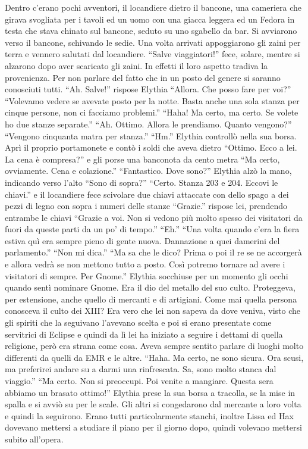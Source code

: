     Dentro c'erano pochi avventori, il locandiere dietro il bancone, una
    cameriera che girava svogliata per i tavoli ed un uomo con una giacca
    leggera ed un Fedora in testa che stava chinato sul bancone, seduto su
    uno sgabello da bar. Si avviarono verso il bancone, schivando le sedie.
    Una volta arrivati appoggiarono gli zaini per terra e vennero salutati
    dal locandiere. ``Salve viaggiatori!'' fece, solare, mentre si alzarono
    dopo aver scaricato gli zaini. In effetti il loro aspetto tradiva la
    provenienza. Per non parlare del fatto che in un posto del genere si
    saranno conosciuti tutti. ``Ah. Salve!'' rispose Elythia ``Allora. Che
    posso fare per voi?'' ``Volevamo vedere se avevate posto per la notte.
    Basta anche una sola stanza per cinque persone, non ci facciamo
    problemi.'' ``Haha! Ma certo, ma certo. Se volete ho due stanze
    separate.'' ``Ah. Ottimo. Allora le prendiamo. Quanto vengono?''
    ``Vengono cinquanta matra per stanza.'' ``Hm.'' Elythia controllò nella
    sua borsa. Aprì il proprio portamonete e contò i soldi che aveva
    dietro ``Ottimo. Ecco a lei. La cena è compresa?'' e gli porse una
    banconota da cento metra ``Ma certo,
    ovviamente. Cena e colazione.'' ``Fantastico. Dove sono?''  Elythia
    alzò la mano, indicando verso l'alto ``Sono di sopra?'' ``Certo. Stanza
    203 e 204. Eccovi le chiavi.'' e il locandiere fece scivolare due
    chiavi attaccate con dello spago a dei pezzi di legno con sopra i
    numeri delle stanze ``Grazie.'' rispose lei, prendendo entrambe le
    chiavi ``Grazie a voi. Non si vedono più molto spesso dei visitatori da
    fuori da queste parti da un po' di tempo.'' ``Eh.'' ``Una volta quando
    c'era la fiera estiva quì era sempre pieno di gente nuova. Dannazione a
    quei damerini del parlamento.'' ``Non mi dica.'' ``Ma sa che le dico?
    Prima o poi il re se ne accorgerà e allora vedrà se non mettono tutto a
    posto. Così potremo tornare ad avere i visitatori di sempre. Per
    Gnome.'' Elythia socchiuse per un momento gli occhi quando sentì
    nominare Gnome. Era il dio del metallo del suo culto. Proteggeva, per
    estensione, anche quello di mercanti e di artigiani. Come mai quella
    persona conosceva il culto dei XIII? Era vero che lei non sapeva da
    dove veniva, visto che gli spiriti che la seguivano l'avevano scelta e
    poi si erano presentate come servitrici di Eclipse e quindi da lì
    lei ha iniziato a seguire i dettami di quella religione, però era
    strana come cosa. Aveva sempre sentito parlare di luoghi molto
    differenti da quelli da EMR e le altre. ``Haha. Ma certo, ne sono
    sicura. Ora scusi, ma preferirei andare su a darmi una rinfrescata. Sa,
    sono molto stanca dal viaggio.'' ``Ma certo. Non si preoccupi. Poi
    venite a mangiare. Questa sera abbiamo un brasato ottimo!'' Elythia
    prese la sua borsa a tracolla, se la mise in spalla e si avviò su per
    le scale. Gli altri si congedarono dal mercante a loro volta e quindi
    la seguirono. Erano tutti particolarmente stanchi, inoltre Lissa ed Hax
    dovevano mettersi a studiare il piano per il giorno dopo, quindi
    volevano mettersi subito all'opera.

